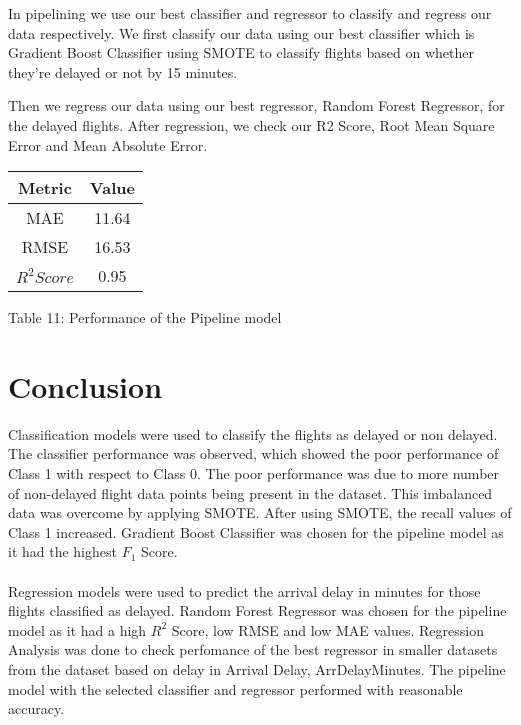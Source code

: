 \documentclass[12pt,letter-paper]{article}
\begin{document}
    In pipelining we use our best classifier and regressor to classify and regress our data respectively. We first classify our data using our best classifier which is Gradient Boost Classifier using SMOTE to classify flights based on whether they’re delayed or not by 15 minutes. 
    
    Then we regress our data using our best regressor, Random Forest Regressor, for the delayed flights. After regression, we check our R2 Score, Root Mean Square Error and Mean Absolute Error. 

    \begin{center}
        \begin{tabular}{ |c|c|} 
         \hline
         Metric & Value\\ 
         \hline
         MAE & 11.64 \\  
         \hline
         RMSE & 16.53\\ 
         \hline
         $R^2 Score$ & 0.95\\ 
         \hline
        \end{tabular}
    \end{center}
    \begin{center}
            Table 11: Performance of the Pipeline model
    \end{center}
    
\section{Conclusion}
    
    Classification models were used to classify the flights as delayed or non delayed. The classifier performance was observed, which showed the poor performance of Class 1 with respect to Class 0. The poor performance was due to more number of non-delayed flight data points being present in the dataset. This imbalanced data was overcome by applying SMOTE. After using SMOTE, the recall values of Class 1 increased. Gradient Boost Classifier was chosen for the pipeline model as it had the highest $F_1$ Score.
    
    \paragraph{}
    Regression models were used to predict the arrival delay in minutes for those flights classified as delayed. Random Forest Regressor was chosen for the pipeline model as it had a high $R^2$ Score, low RMSE and low MAE values. Regression Analysis was done to check perfomance of the best regressor in smaller datasets from the dataset based on delay in Arrival Delay, ArrDelayMinutes. The pipeline model with the selected classifier and regressor performed with reasonable accuracy.
    
\end{document}
